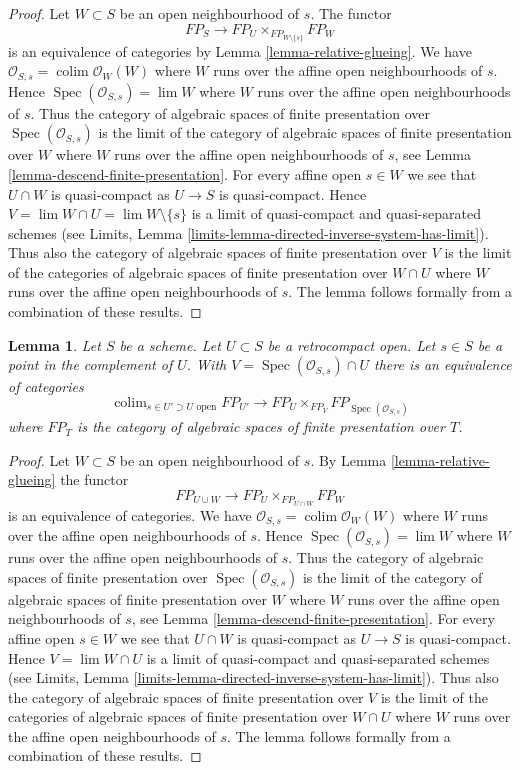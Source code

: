 \documentclass{stacks-project}
\theoremstyle{plain}
\newtheorem{lemma}[subsection]{Lemma}
\theoremstyle{definition}
\theoremstyle{remark}
\numberwithin{equation}{subsection}
\def\lim{\mathop{\mathrm{lim}}\nolimits}
\def\colim{\mathop{\mathrm{colim}}\nolimits}
\def\Spec{\mathop{\mathrm{Spec}}}
\begin{document}
\begin{proof}
Let $W \subset S$ be an open neighbourhood of $s$. The functor
$$
FP_S \to FP_U \times_{FP_{W \setminus \{s\}}} FP_W
$$
is an equivalence of categories by Lemma \ref{lemma-relative-glueing}.
We have $\mathcal{O}_{S, s} = \colim \mathcal{O}_W(W)$ where
$W$ runs over the affine open neighbourhoods of $s$.
Hence $\Spec(\mathcal{O}_{S, s}) = \lim W$ where $W$
runs over the affine open neighbourhoods of $s$.
Thus the category of algebraic spaces of finite presentation
over $\Spec(\mathcal{O}_{S, s})$ is the limit of the
category of algebraic spaces of finite presentation over
$W$ where $W$ runs over the affine open neighbourhoods
of $s$, see
Lemma \ref{lemma-descend-finite-presentation}.
For every affine open $s \in W$ we see that $U \cap W$
is quasi-compact as $U \to S$ is quasi-compact.
Hence $V = \lim W \cap U = \lim W \setminus \{s\}$ is a limit of
quasi-compact and quasi-separated schemes (see
Limits, Lemma \ref{limits-lemma-directed-inverse-system-has-limit}).
Thus also the category of algebraic spaces of finite presentation
over $V$ is the limit of the
categories of algebraic spaces of finite presentation over
$W \cap U$ where $W$ runs over the affine open neighbourhoods
of $s$. The lemma follows formally from a combination
of these results.
\end{proof}

\begin{lemma}
\label{lemma-glueing-near-point}
Let $S$ be a scheme. Let $U \subset S$ be a retrocompact open.
Let $s \in S$ be a point in the complement of $U$. With
$V = \Spec(\mathcal{O}_{S, s}) \cap U$ there is
an equivalence of categories
$$
\colim_{s \in U' \supset U\text{ open}} FP_{U'}
\longrightarrow
FP_U \times_{FP_V} FP_{\Spec(\mathcal{O}_{S, s})}
$$
where $FP_T$  is the category of algebraic spaces of finite presentation
over $T$.
\end{lemma}

\begin{proof}
Let $W \subset S$ be an open neighbourhood of $s$. By
Lemma \ref{lemma-relative-glueing} the functor
$$
FP_{U \cup W}
\longrightarrow
FP_U \times_{FP_{U \cap W}} FP_W
$$
is an equivalence of categories. We have
$\mathcal{O}_{S, s} = \colim \mathcal{O}_W(W)$ where
$W$ runs over the affine open neighbourhoods of $s$.
Hence $\Spec(\mathcal{O}_{S, s}) = \lim W$ where $W$
runs over the affine open neighbourhoods of $s$.
Thus the category of algebraic spaces of finite presentation
over $\Spec(\mathcal{O}_{S, s})$ is the limit of the
category of algebraic spaces of finite presentation over
$W$ where $W$ runs over the affine open neighbourhoods
of $s$, see
Lemma \ref{lemma-descend-finite-presentation}.
For every affine open $s \in W$ we see that $U \cap W$
is quasi-compact as $U \to S$ is quasi-compact.
Hence $V = \lim W \cap U$ is a limit of
quasi-compact and quasi-separated schemes (see
Limits, Lemma \ref{limits-lemma-directed-inverse-system-has-limit}).
Thus also the category of algebraic spaces of finite presentation
over $V$ is the limit of the
categories of algebraic spaces of finite presentation over
$W \cap U$ where $W$ runs over the affine open neighbourhoods
of $s$. The lemma follows formally from a combination
of these results.
\end{proof}
\end{document}

